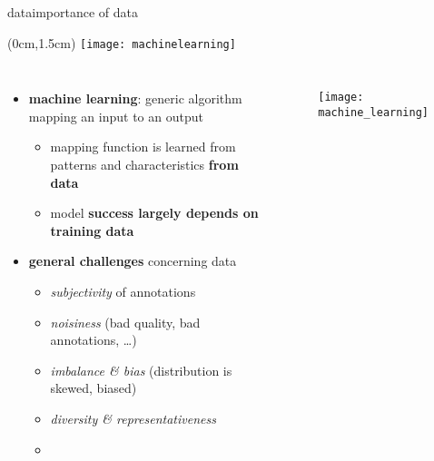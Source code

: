 \begin{frame}{data}{importance of data}
    \vspace{-5mm}
    \begin{textblock*}{100mm}(0cm,1.5cm)
        \texttt{[image: machinelearning]}
    \end{textblock*}           
    
    \begin{columns}
    \begin{itemize}
 
        \item<1->   \textbf{machine learning}: generic algorithm mapping an input to an output
            \begin{itemize}
                \item<2->   mapping function is learned from patterns and characteristics \textbf{from data}
                \item<2->[$\Rightarrow$]   model \textbf{success largely depends on training data}
                
            \end{itemize}
        \bigskip
        \item<3->   \textbf{general challenges} concerning data
            \begin{itemize}
                \item   \textit{subjectivity} of annotations
                \item   \textit{noisiness} (bad quality, bad annotations, \ldots)
                \item   \textit{imbalance \& bias} (distribution is skewed, biased)
				\item   \textit{diversity \& representativeness}
                \item   {}
            \end{itemize}
    \end{itemize}
        \begin{figure}
            \texttt{[image: machine\_learning]}
        \end{figure}
    \end{columns}
\end{frame}



